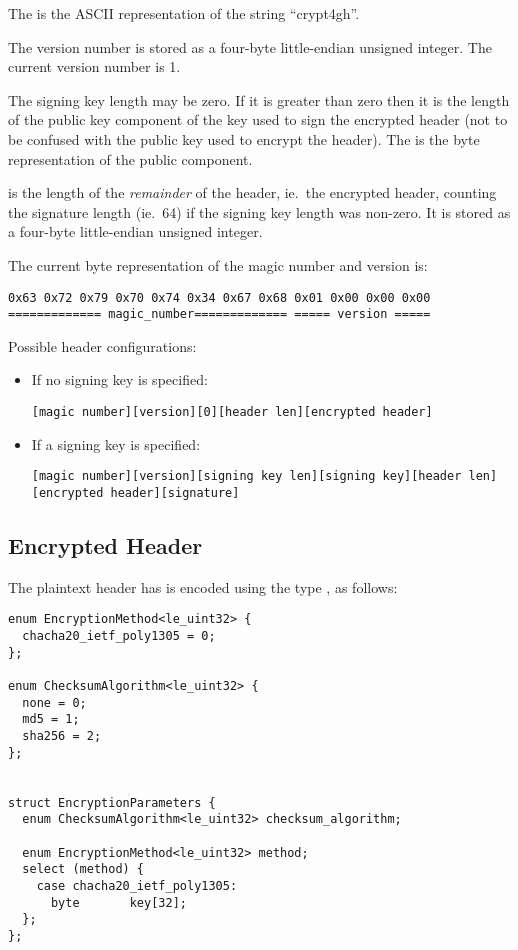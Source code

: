 The  is the ASCII representation of the string ``crypt4gh''.

The version number is stored as a four-byte little-endian unsigned integer.
%
The current version number is 1.

The signing key length may be zero.
%
If it is greater than zero then it is the length of the public key
component of the key used to sign the encrypted header (not to be
confused with the public key used to encrypt the header).
%
The  is the byte representation of the public
component.

 is the length of the \emph{remainder} of the header,
ie.\ the encrypted header, counting the signature length (ie.\ 64) if
the signing key length was non-zero.
%
It is stored as a four-byte little-endian unsigned integer.

The current byte representation of the magic number and version is:
\begin{verbatim}
0x63 0x72 0x79 0x70 0x74 0x34 0x67 0x68 0x01 0x00 0x00 0x00
============= magic_number============= ===== version =====
\end{verbatim}

Possible header configurations:
%
\begin{itemize}
%
\item If no signing key is specified:
\begin{verbatim}
[magic number][version][0][header len][encrypted header]
\end{verbatim}
%
\item If a signing key is specified:
\begin{verbatim}
[magic number][version][signing key len][signing key][header len][encrypted header][signature]
\end{verbatim}
%
\end{itemize}


\subsection{Encrypted Header}\label{encrypted:header}
%

The plaintext header has is encoded using the type
, as follows:

\begin{verbatim}
enum EncryptionMethod<le_uint32> {
  chacha20_ietf_poly1305 = 0;
};

enum ChecksumAlgorithm<le_uint32> {
  none = 0;
  md5 = 1;
  sha256 = 2;
};


struct EncryptionParameters {
  enum ChecksumAlgorithm<le_uint32> checksum_algorithm;

  enum EncryptionMethod<le_uint32> method;
  select (method) {
    case chacha20_ietf_poly1305:
      byte       key[32];
  };
};
\end{verbatim}


